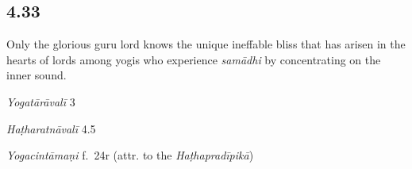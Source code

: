 \begin{ekdosis}
\begin{testimonia}[hp04_032_8]
\end{testimonia}


\subsection*{4.33}
\begin{translation}[hp04_033]
Only the glorious guru lord knows the unique ineffable bliss that has arisen in the hearts of lords among yogis who experience \textit{samādhi} by concentrating on the inner sound.
\end{translation}


\begin{sources}[hp04_033]
\emph{Yogatārāvalī} 3
\begin{versinnote}
\tl{\var{ekaḥ ] Pa : eva Ad}\\!}
\end{versinnote}
\end{sources}

\begin{testimonia}[hp04_033]
\emph{Haṭharatnāvalī} 4.5
\begin{versinnote}
\end{versinnote}

\emph{Yogacintāmaṇi} f.~24r (attr. to the \emph{Haṭhapradīpikā})
\begin{versinnote}
\end{versinnote}


\end{testimonia}
\end{ekdosis}
